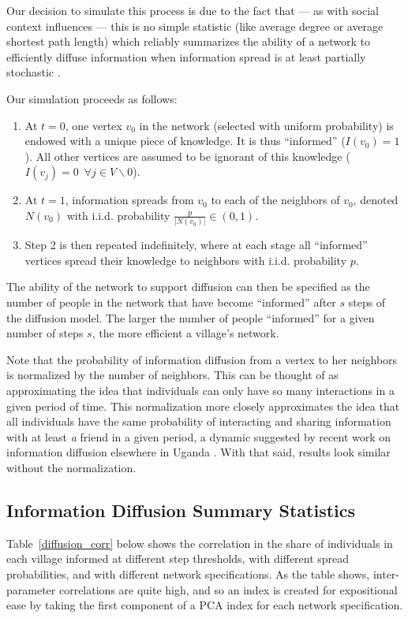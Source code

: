 \documentclass[12pt]{article}
\begin{document}
\begin{appendix}
Our decision to simulate this process is due to the fact that --- as with social context influences --- this is no simple statistic (like average degree or average shortest path length) which reliably summarizes the ability of a network to efficiently diffuse information when information spread is at least partially stochastic \citep[p. 19-35]{Newman:jyb}.

Our simulation proceeds as follows:
\begin{enumerate}
	\item At $t=0$, one vertex $v_0$ in the network (selected with uniform probability) is endowed with a unique piece of knowledge. It is thus ``informed'' ($I(v_0) = 1$). All other vertices are assumed to be ignorant of this knowledge ($I(v_j) = 0 \,\,\, \forall j\in V\backslash 0$).
	\item At $t=1$, information spreads from $v_0$ to each of the neighbors of $v_0$, denoted $N(v_0)$ with i.i.d. probability $\frac{p}{|N(v_0)|} \in(0,1)$.
	\item Step 2 is then repeated indefinitely, where at each stage all ``informed'' vertices spread their knowledge to neighbors with i.i.d. probability $p$.
\end{enumerate}

The ability of the network to support diffusion can then be specified as the number of people in the network that have become ``informed'' after $s$ steps of the diffusion model. The larger the number of people ``informed'' for a given number of steps $s$, the more efficient a village's network.

Note that the probability of information diffusion from a vertex to her neighbors is normalized by the number of neighbors. This can be thought of as approximating the idea that individuals can only have so many interactions in a given period of time. This normalization more closely approximates the idea that all individuals have the same probability of interacting and sharing information with at least \emph{a} friend in a given period, a dynamic suggested by recent work on information diffusion elsewhere in Uganda \citep{Larson:2016uz}. With that said, results look similar without the normalization.



\subsection{Information Diffusion Summary Statistics}
Table~\ref{diffusion_corr} below shows the correlation in the share of individuals in each village informed at different step thresholds, with different spread probabilities, and with different network specifications. As the table shows, inter-parameter correlations are quite high, and so an index is created for expositional ease by taking the first component of a PCA index for each network specification.


\end{appendix}
\end{document}
